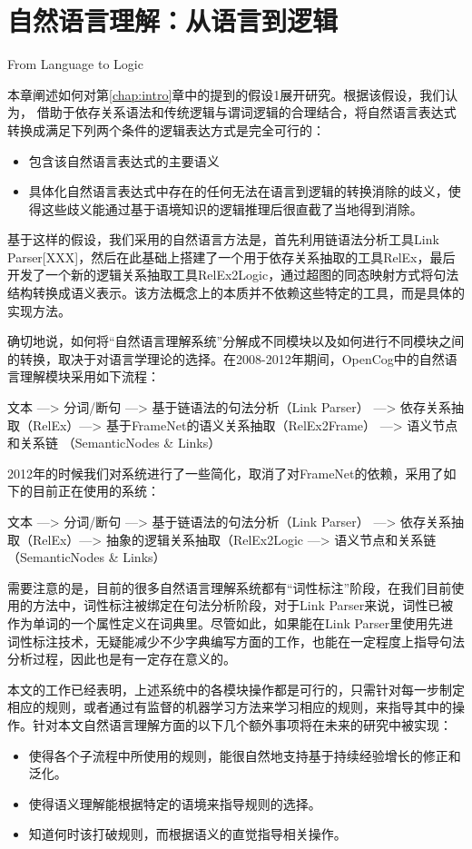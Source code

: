 \chapter{自然语言理解：从语言到逻辑}{From Language to Logic}
\label{chap:comprehension}

本章阐述如何对第\ref{chap:intro}章中的提到的假设1展开研究。根据该假设，我们认为， 借助于依存关系语法和传统逻辑与谓词逻辑的合理结合，将自然语言表达式转换成满足下列两个条件的逻辑表达方式是完全可行的：
\begin{itemize}
\item 包含该自然语言表达式的主要语义
\item 具体化自然语言表达式中存在的任何无法在语言到逻辑的转换消除的歧义，使得这些歧义能通过基于语境知识的逻辑推理后很直截了当地得到消除。
\end{itemize}

基于这样的假设，我们采用的自然语言方法是，首先利用链语法分析工具Link Parser[XXX]，然后在此基础上搭建了一个用于依存关系抽取的工具RelEx，最后开发了一个新的逻辑关系抽取工具RelEx2Logic，通过超图的同态映射方式将句法结构转换成语义表示。该方法概念上的本质并不依赖这些特定的工具，而是具体的实现方法。

确切地说，如何将“自然语言理解系统”分解成不同模块以及如何进行不同模块之间的转换，取决于对语言学理论的选择。在2008-2012年期间，OpenCog中的自然语言理解模块采用如下流程：

文本 —> 分词/断句 —> 基于链语法的句法分析（Link Parser） —> 依存关系抽取（RelEx）—> 基于FrameNet的语义关系抽取（RelEx2Frame） —> 语义节点和关系链 （SemanticNodes \& Links）

2012年的时候我们对系统进行了一些简化，取消了对FrameNet的依赖，采用了如下的目前正在使用的系统：

文本 —> 分词/断句 —> 基于链语法的句法分析（Link Parser） —> 依存关系抽取（RelEx）—> 抽象的逻辑关系抽取（RelEx2Logic —> 语义节点和关系链 （SemanticNodes \& Links）

需要注意的是，目前的很多自然语言理解系统都有“词性标注”阶段，在我们目前使用的方法中，词性标注被绑定在句法分析阶段，对于Link Parser来说，词性已被作为单词的一个属性定义在词典里。尽管如此，如果能在Link Parser里使用先进词性标注技术，无疑能减少不少字典编写方面的工作，也能在一定程度上指导句法分析过程，因此也是有一定存在意义的。

本文的工作已经表明，上述系统中的各模块操作都是可行的，只需针对每一步制定相应的规则，或者通过有监督的机器学习方法来学习相应的规则，来指导其中的操作。针对本文自然语言理解方面的以下几个额外事项将在未来的研究中被实现：
\begin{itemize}
\item 使得各个子流程中所使用的规则，能很自然地支持基于持续经验增长的修正和泛化。
\item 使得语义理解能根据特定的语境来指导规则的选择。
\item 知道何时该打破规则，而根据语义的直觉指导相关操作。
\end{itemize}

